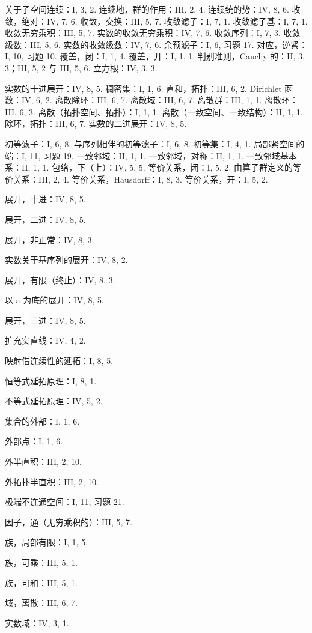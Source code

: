 关于子空间连续：I, 3, 2. 连续地，群的作用：III, 2, 4. 连续统的势：IV, 8, 6. 收敛，绝对：IV, 7, 6. 收敛，交换：III, 5, 7. 收敛滤子：I, 7, 1. 收敛滤子基：I, 7, 1. 收敛无穷乘积：III, 5, 7. 实数的收敛无穷乘积：IV, 7, 6. 收敛序列：I, 7, 3. 收敛级数：III, 5, 6. 实数的收敛级数：IV, 7, 6. 余预滤子：I, 6, 习题 17. 对应，逆紧：I, 10, 习题 10. 覆盖，闭：I, 1, 4. 覆盖，开：I, 1, 1. 判别准则，Cauchy 的：II, 3, 3；III, 5, 2 与 III, 5, 6. 立方根：IV, 3, 3.

实数的十进展开：IV, 8, 5. 稠密集：I, 1, 6. 直和，拓扑：III, 6, 2. Dirichlet 函数：IV, 6, 2. 离散除环：III, 6, 7. 离散域：III, 6, 7. 离散群：III, 1, 1. 离散环：III, 6, 3. 离散（拓扑空间、拓扑）：I, 1, 1. 离散（一致空间、一致结构）：II, 1, 1. 除环，拓扑：III, 6, 7. 实数的二进展开：IV, 8, 5.

初等滤子：I, 6, 8. 与序列相伴的初等滤子：I, 6, 8. 初等集：I, 4, 1. 局部紧空间的端：I, 11, 习题 19. 一致邻域：II, 1, 1. 一致邻域，对称：II, 1, 1. 一致邻域基本系：II, 1, 1. 包络，下（上）：IV, 5, 5. 等价关系，闭：I, 5, 2. 由算子群定义的等价关系：III, 2, 4. 等价关系，Hausdorff：I, 8, 3. 等价关系，开：I, 5, 2.

展开，十进：IV, 8, 5.

展开，二进：IV, 8, 5.

展开，非正常：IV, 8, 3.

实数关于基序列的展开：IV, 8, 2.

展开，有限（终止）：IV, 8, 3.

以 a 为底的展开：IV, 8, 5.

展开，三进：IV, 8, 5.

扩充实直线：IV, 4, 2.

映射借连续性的延拓：I, 8, 5.

恒等式延拓原理：I, 8, 1.

不等式延拓原理：IV, 5, 2.

集合的外部：I, 1, 6.

外部点：I, 1, 6.

外半直积：III, 2, 10.

外拓扑半直积：III, 2, 10.

极端不连通空间：I, 11, 习题 21.

因子，通（无穷乘积的）：III, 5, 7.

族，局部有限：I, 1, 5.

族，可乘：III, 5, 1.

族，可和：III, 5, 1.

域，离散：III, 6, 7.

实数域：IV, 3, 1.

